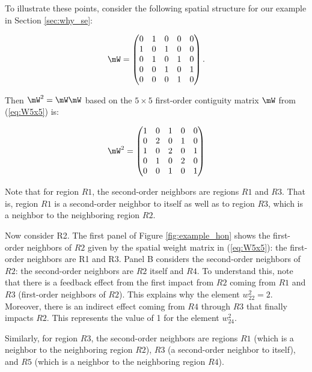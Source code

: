 To illustrate these points, consider the following spatial structure for our example in Section \ref{sec:why_se}:

\begin{equation}\label{eq:W5x5}
\mW = \begin{pmatrix}
      0 & 1 & 0 & 0 & 0 \\
      1 & 0 & 1 & 0 & 0 \\
      0 & 1 & 0 & 1 & 0 \\
      0 & 0 & 1 & 0 & 1 \\
      0 & 0 & 0 & 1 & 0
      \end{pmatrix}.
\end{equation}

Then $\mW^2 = \mW\mW$ based on the $5\times 5$ first-order contiguity matrix $\mW$ from (\ref{eq:W5x5}) is:

\begin{equation}
\mW^2 = \begin{pmatrix}\label{eq:W25x5}
      1 & 0 & 1 & 0 & 0 \\
      0 & 2 & 0 & 1 & 0 \\
      1 & 0 & 2 & 0 & 1 \\
      0 & 1 & 0 & 2 & 0 \\
      0 & 0 & 1 & 0 & 1
      \end{pmatrix}
\end{equation}

Note that for region $R1$, the second-order neighbors are regions $R1$ and $R3$. That is, region $R1$ is a second-order neighbor to itself as well as to region $R3$, which is a neighbor to the neighboring region $R2$. 

Now consider R2. The first panel of Figure \ref{fig:example_hon} shows the first-order neighbors of $R2$ given by the spatial weight matrix in (\ref{eq:W5x5}): the first-order neighbors are R1 and R3. Panel B considers the second-order neighbors of $R2$: the second-order neighbors are $R2$ itself and $R4$. To understand this, note that there is a feedback effect from the first impact from $R2$ coming from $R1$ and $R3$ (first-order neighbors of $R2$). This explains why the element $w^2_{22} = 2$. Moreover, there is an indirect effect coming from $R4$ through $R3$ that finally impacts $R2$.  This represents the value of 1 for the element $w^2_{24}$.

Similarly, for region $R3$, the second-order neighbors are regions $R1$ (which is a neighbor to the neighboring region $R2$), $R3$ (a second-order neighbor to itself), and $R5$ (which is a neighbor to the neighboring region $R4$). 

